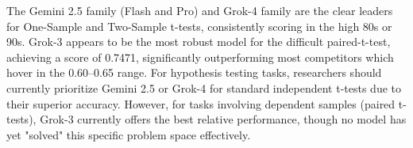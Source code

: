 \documentclass{article}
\begin{document}
The Gemini 2.5 family (Flash and Pro) and Grok-4 family are the clear leaders for One-Sample and Two-Sample t-tests, consistently scoring in the high 80s or 90s. Grok-3 appears to be the most robust model for the difficult paired-t-test, achieving a score of 0.7471, significantly outperforming most competitors which hover in the 0.60–0.65 range. For hypothesis testing tasks, researchers should currently prioritize Gemini 2.5 or Grok-4 for standard independent t-tests due to their superior accuracy. However, for tasks involving dependent samples (paired t-tests), Grok-3 currently offers the best relative performance, though no model has yet "solved" this specific problem space effectively.        
        
\end{document}
